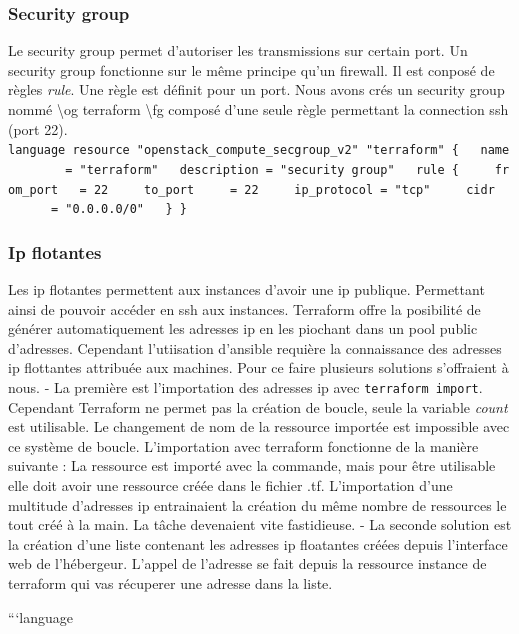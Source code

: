 \documentclass[]{article}
\begin{document}
\subsubsection{Security group}\label{security-group}

Le security group permet d'autoriser les transmissions sur certain port.
Un security group fonctionne sur le même principe qu'un firewall. Il est
conposé de règles \emph{rule}. Une règle est définit pour un port. Nous
avons crés un security group nommé \textbackslash{}og terraform
\textbackslash{}fg composé d'une seule règle permettant la connection
ssh (port 22).
\texttt{language\ resource\ "openstack\_compute\_secgroup\_v2"\ "terraform"\ \{\ \ \ name\ \ \ \ \ \ \ \ =\ "terraform"\ \ \ description\ =\ "security\ group"\ \ \ rule\ \{\ \ \ \ \ from\_port\ \ \ =\ 22\ \ \ \ \ to\_port\ \ \ \ \ =\ 22\ \ \ \ \ ip\_protocol\ =\ "tcp"\ \ \ \ \ cidr\ \ \ \ \ \ \ \ =\ "0.0.0.0/0"\ \ \ \}\ \}}

\subsubsection{Ip flotantes}\label{ip-flotantes}

Les ip flotantes permettent aux instances d'avoir une ip publique.
Permettant ainsi de pouvoir accéder en ssh aux instances. Terraform
offre la posibilité de générer automatiquement les adresses ip en les
piochant dans un pool public d'adresses. Cependant l'utiisation
d'ansible requière la connaissance des adresses ip flottantes attribuée
aux machines. Pour ce faire plusieurs solutions s'offraient à nous. - La
première est l'importation des adresses ip avec
\texttt{terraform\ import}. Cependant Terraform ne permet pas la
création de boucle, seule la variable \emph{count} est utilisable. Le
changement de nom de la ressource importée est impossible avec ce
système de boucle. L'importation avec terraform fonctionne de la manière
suivante : La ressource est importé avec la commande, mais pour être
utilisable elle doit avoir une ressource créée dans le fichier .tf.
L'importation d'une multitude d'adresses ip entrainaient la création du
même nombre de ressources le tout créé à la main. La tâche devenaient
vite fastidieuse. - La seconde solution est la création d'une liste
contenant les adresses ip floatantes créées depuis l'interface web de
l'hébergeur. L'appel de l'adresse se fait depuis la ressource instance
de terraform qui vas récuperer une adresse dans la liste.

```language
\end{document}
